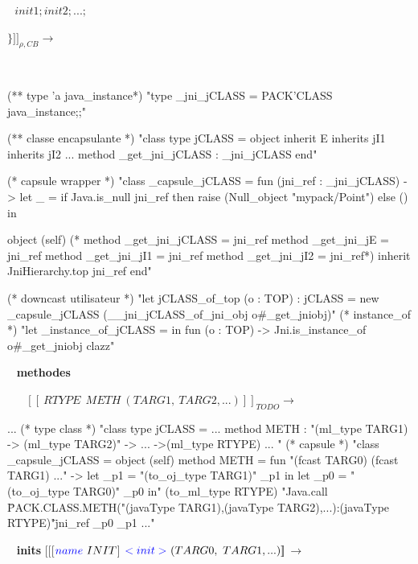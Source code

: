 \documentclass[a4paper, 11pt]{article}
\begin{document}
  $\ \ \ init1; init2; ...;$

 $\} ]\!]_{\rho,CB}\longrightarrow$

\ 
\newline

\begin{OCaml}

(** type 'a java_instance*)
"type _jni_jCLASS = PACK'CLASS java_instance;;"

(** classe encapsulante *)
"class type jCLASS =
   object inherit E
   inherits jI1
   inherits jI2 ...
   method _get_jni_jCLASS : _jni_jCLASS
   end"

(* capsule wrapper *)
"class _capsule_jCLASS = 
  fun (jni_ref : _jni_jCLASS) ->
     let _ =
        if Java.is_null jni_ref
        then raise (Null_object "mypack/Point")
        else ()
     in

    object (self)
     (* method _get_jni_jCLASS = jni_ref
      method _get_jni_jE = jni_ref
      method _get_jni_jI1 = jni_ref
      method _get_jni_jI2 = jni_ref*)
      inherit JniHierarchy.top jni_ref
    end"

(* downcast utilisateur *)
"let jCLASS_of_top (o : TOP) : jCLASS =
    new _capsule_jCLASS (__jni_jCLASS_of_jni_obj o#_get_jniobj)"
(* instance_of *)
"let _instance_of_jCLASS =
    in fun (o : TOP) -> Jni.is_instance_of o#_get_jniobj clazz"


\end{OCaml}
\ 
\newline
\noindent
\textbf{ methodes } 



\ 
\newline
\ 
\newline
\noindent
$[\![\ RTYPE\ \ METH\ (TARG1,\ TARG2, ...)]\!]_{ TODO }$$\longrightarrow$

\begin{OCaml}
...
(* type class *)
"class type jCLASS =
   ...
   method METH : "(ml_type TARG1) -> (ml_type TARG2)" -> ... ->(ml_type RTYPE)
   ... "
(* capsule *)
"class _capsule_jCLASS =
   object (self)      
      method METH =
         fun "(fcast TARG0) (fcast TARG1) ..." ->
           let _p1 = "(to_oj_type TARG1)" _p1 in
           let _p0 = "(to_oj_type TARG0)" _p0
           in"
             (to_ml_type RTYPE)
             "Java.call \"PACK.CLASS.METH("(javaType TARG1),(javaType TARG2),...):(javaType RTYPE)"\" jni_ref _p0 _p1 ..."

\end{OCaml}
\ 
\newline
\noindent
\textbf{ inits }
\newline
\noindent
$[\![$[$ {\color{blue}name}\ INIT $]$\ {\color{blue}
      <init>}\ (TARG0,\ TARG1, ...)]\!]_{}$$\longrightarrow$
% 
\end{document}
